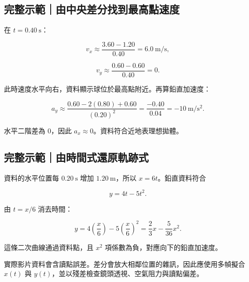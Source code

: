 \documentclass[11pt,a4paper]{article}
\begin{document}
\begin{HandoutWorkedExample}

\subsection{完整示範｜由中央差分找到最高點速度}\label{ux5b8cux6574ux793aux7bc4ux7531ux4e2dux592eux5deeux5206ux627eux5230ux6700ux9ad8ux9edeux901fux5ea6}

在 \(t=0.40\ \mathrm s\)：

\[
v_x\approx\frac{3.60-1.20}{0.40}=6.0\ \mathrm{m/s},
\]

\[
v_y\approx\frac{0.60-0.60}{0.40}=0.
\]

此時速度水平向右，資料顯示球位於最高點附近。再算鉛直加速度：

\[
a_y\approx\frac{0.60-2(0.80)+0.60}{(0.20)^2}
=\frac{-0.40}{0.04}
=-10\ \mathrm{m/s^2}.
\]

水平二階差為 0，因此 \(a_x\approx0\)。資料符合近地表理想拋體。

\end{HandoutWorkedExample}

\begin{HandoutWorkedExample}

\subsection{完整示範｜由時間式還原軌跡式}\label{ux5b8cux6574ux793aux7bc4ux7531ux6642ux9593ux5f0fux9084ux539fux8eccux8de1ux5f0f}

資料的水平位置每 \(0.20\ \mathrm s\) 增加 \(1.20\ \mathrm m\)，所以 \(x=6t\)。鉛直資料符合

\[
y=4t-5t^2.
\]

由 \(t=x/6\) 消去時間：

\[
y=4\left(\frac{x}{6}\right)-5\left(\frac{x}{6}\right)^2
=\frac23x-\frac5{36}x^2.
\]

這條二次曲線通過資料點，且 \(x^2\) 項係數為負，對應向下的鉛直加速度。

\end{HandoutWorkedExample}

實際影片資料會含讀點誤差。差分會放大相鄰位置的雜訊，因此應使用多幀擬合 \(x(t)\) 與 \(y(t)\)，並以殘差檢查鏡頭透視、空氣阻力與讀點偏差。
\end{document}
